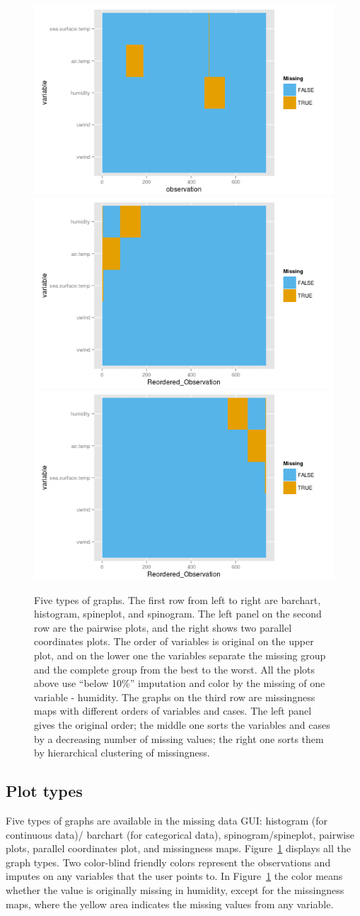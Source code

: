\documentclass[article]{jss}
\begin{document}
\begin{center}
\begin{figure}[h]
\begin{centering}
\includegraphics[width=.32\textwidth]{graph/fig5-3-map-1}
\includegraphics[width=.32\textwidth]{graph/fig5-3-map-2}
\includegraphics[width=.32\textwidth]{graph/fig5-3-map-3}
\par\end{centering}
\caption{Five types of graphs.
The first row from left to right are barchart, histogram, spineplot, and spinogram. The left panel on the second row are the pairwise plots, and the right shows two parallel coordinates plots. The order of variables is original on the upper plot, and on the lower one the variables separate the missing group and the complete group from the best to the worst. All the plots above use ``below 10\%'' imputation and color by the missing of one variable - humidity. The graphs on the third row are missingness maps with different orders of variables and cases. The left panel gives the original order; the middle one sorts the variables and cases by a decreasing number of missing values; the right one sorts them by hierarchical clustering of missingness.}
\label{fig:graphtypes}
\end{figure}
\par\end{center}

\clearpage

\subsection{Plot types}\label{plottype}

Five types of graphs are available in the missing data GUI: histogram (for continuous data)/ barchart (for categorical data), spinogram/spineplot, pairwise plots, parallel coordinates plot, and missingness maps. Figure~\ref{fig:graphtypes} displays all the graph types. Two color-blind friendly colors represent the observations and imputes on any variables that the user points to. In Figure~\ref{fig:graphtypes} the color means whether the value is originally missing in humidity, except for the missingness maps, where the yellow area indicates the missing values from any variable.
\end{document}
